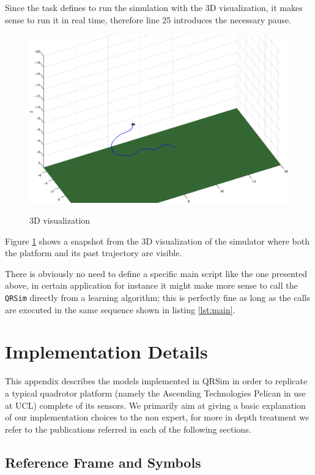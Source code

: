 \documentclass[a4paper,11pt]{report}
\newcommand{\sname}{QRSim\xspace}
\newcommand{\snamettt}{\texttt{QRSim}\xspace}
\begin{document}
Since the task defines to run the simulation with the 3D visualization, it makes sense to run it in real time, therefore line 25 introduces the necessary pause.  


\begin{figure}
\begin{center}
\label{fig:3d}
\includegraphics[width=13cm]{./3d.eps}
 \caption{3D visualization}
\end{center}
\end{figure}

Figure \ref{fig:3d} shows a snapshot from the 3D visualization of the simulator where both the platform and its past trajectory are visible.

There is obviously no need to define a specific main script like the one presented above, in certain application for instance it might make more sense to call the \snamettt directly from  a learning algorithm; this is perfectly fine as long as the calls are executed in the same sequence shown in listing \ref{lst:main}.


\appendix
\chapter{Implementation Details}

This appendix describes the models implemented in \sname in order to replicate a typical quadrotor platform (namely the Ascending Technologies Pelican \cite{asctec2011pelican} in use at UCL) complete of its sensors.
We primarily aim at giving a basic explanation of our implementation choices to the non expert, for more in depth treatment we refer to the publications referred in each of the following sections.

\section{Reference Frame and Symbols}
\end{document}
